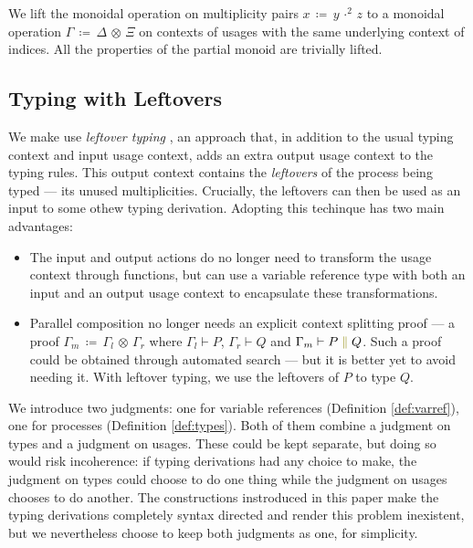 \documentclass[a4paper,UKenglish,cleveref, autoref, thm-restate,authorcolumns]{lipics-v2019}
\theoremstyle{definition}
\newcommand{\constr}[1]{\textcolor{olive}{\operatorname{#1}}}
\newcommand{\comp}[2]{#1 \; \constr{\parallel} \; #2}
\newcommand{\opsquared}[3]{#1 \, \coloneqq \, #2 \, \cdot^2 \, #3}
\newcommand{\opctx}[3]{#1 \, \coloneqq \, #2 \, \otimes \, #3}
\begin{document}
\begin{note}
  We lift the monoidal operation on multiplicity pairs $\opsquared{x}{y}{z}$ to a monoidal operation $\opctx{\Gamma}{\Delta}{\Xi}$ on contexts of usages with the same underlying context of indices.
  All the properties of the partial monoid are trivially lifted.
\end{note}

\subsection{Typing with Leftovers}
\label{leftover-typing}

We make use \emph{leftover typing} \cite{}, an approach that, in addition to the usual typing context and input usage context, adds an extra output usage context to the typing rules.
This output context contains the \emph{leftovers} of the process being typed --- its unused multiplicities.
Crucially, the leftovers can then be used as an input to some othew typing derivation.
Adopting this techinque has two main advantages:
\begin{itemize}
  \item
    The input and output actions do no longer need to transform the usage context through functions, but can use a variable reference type with both an input and an output usage context to encapsulate these transformations.
  \item
    Parallel composition no longer needs an explicit context splitting proof --- a proof $\opctx{\Gamma_m}{\Gamma_l}{\Gamma_r}$ where $\Gamma_l \vdash P$, $\Gamma_r \vdash Q$ and $\Gamma_m \vdash \comp{P}{Q}$.
    Such a proof could be obtained through automated search --- but it is better yet to avoid needing it.
    With leftover typing, we use the leftovers of $P$ to type $Q$.
\end{itemize}
  
We introduce two judgments: one for variable references (Definition \ref{def:varref}), one for processes (Definition \ref{def:types}).
Both of them combine a judgment on types and a judgment on usages.
These could be kept separate, but doing so would risk incoherence: if typing derivations had any choice to make, the judgment on types could choose to do one thing while the judgment on usages chooses to do another.
The constructions instroduced in this paper make the typing derivations completely syntax directed and render this problem inexistent, but we nevertheless choose to keep both judgments as one, for simplicity.
\end{document}
